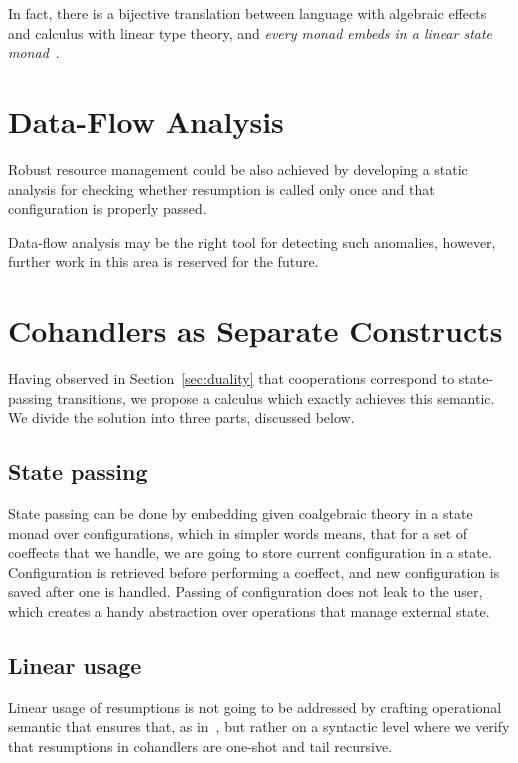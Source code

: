 \documentclass[declaration,shortabstract]{iithesis}
\theoremstyle{definition} \newtheorem{definition}{Definition}[chapter]
\theoremstyle{remark} \newtheorem{remark}[definition]{Observation}
\theoremstyle{plain} \newtheorem{theorem}[definition]{Theorem}
\theoremstyle{plain} \newtheorem{lemma}[definition]{Lemma}
\begin{document}
In fact, there is a bijective translation between language with algebraic effects
and calculus with linear type theory, and \textit{every monad embeds in a linear
state monad}~\cite{linear-usage-of-state}.

\section{Data-Flow Analysis}\label{sec:data-flow}

Robust resource management could be also achieved by developing a static
analysis for checking whether resumption is called only once and that
configuration is properly passed.

Data-flow analysis may be the right tool for detecting such anomalies, however,
further work in this area is reserved for the future.

\section{Cohandlers as Separate Constructs}\label{sec:cohandlers-solution}


Having observed in Section~\ref{sec:duality} that cooperations correspond to
state-passing transitions, we propose a calculus which exactly achieves this
semantic. We divide the solution into three parts, discussed below.

\subsection{State passing}

State passing can be done by embedding given coalgebraic theory in a state monad
over configurations, which in simpler words means, that for a set of coeffects
that we handle, we are going to store current configuration in a state.
Configuration is retrieved before performing a coeffect, and new configuration
is saved after one is handled. Passing of configuration does not leak to the
user, which creates a handy abstraction over operations that manage external
state.

\subsection{Linear usage}

Linear usage of resumptions is not going to be addressed by crafting operational
semantic that ensures that, as in~\cite{runners-in-action}, but rather on a
syntactic level where we verify that resumptions in cohandlers are one-shot and
tail recursive.
\end{document}
